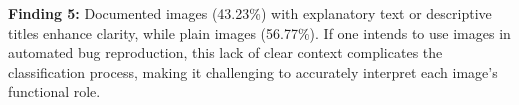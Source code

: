 \begin{tcolorbox}[colback=blue!5, colframe=black, boxrule=0.5pt]
\textbf{Finding 5:}
%
Documented images (43.23\%) with explanatory text or descriptive titles enhance clarity, while plain images (56.77\%). If one intends to use images in automated bug reproduction, this lack of clear context complicates the classification process, making it challenging to accurately interpret each image's functional role.
%
\end{tcolorbox}


